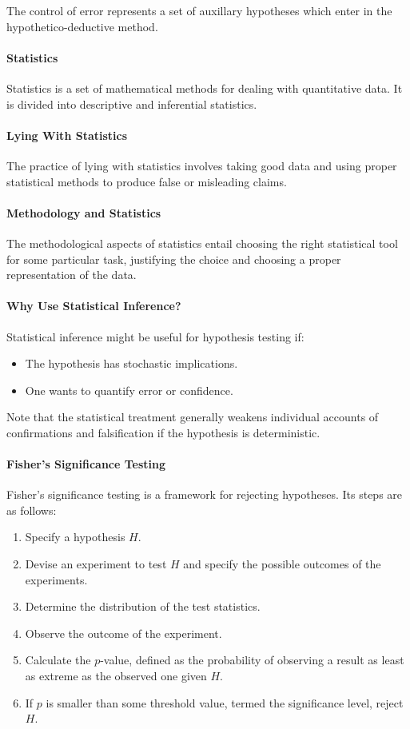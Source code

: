 The control of error represents a set of auxillary hypotheses which enter in the hypothetico-deductive method.

\paragraph{Statistics}
Statistics is a set of mathematical methods for dealing with quantitative data. It is divided into descriptive and inferential statistics.

\paragraph{Lying With Statistics}
The practice of lying with statistics involves taking good data and using proper statistical methods to produce false or misleading claims.

\paragraph{Methodology and Statistics}
The methodological aspects of statistics entail choosing the right statistical tool for some particular task, justifying the choice and choosing a proper representation of the data.

\paragraph{Why Use Statistical Inference?}
Statistical inference might be useful for hypothesis testing if:
\begin{itemize}
	\item The hypothesis has stochastic implications.
	\item One wants to quantify error or confidence.
\end{itemize}

Note that the statistical treatment generally weakens individual accounts of confirmations and falsification if the hypothesis is deterministic.

\paragraph{Fisher's Significance Testing}
Fisher's significance testing is a framework for rejecting hypotheses. Its steps are as follows:

\begin{enumerate}
	\item Specify a hypothesis $H$.
	\item Devise an experiment to test $H$ and specify the possible outcomes of the experiments.
	\item Determine the distribution of the test statistics.
	\item Observe the outcome of the experiment.
	\item Calculate the $p$-value, defined as the probability of observing a result as least as extreme as the observed one given $H$.
	\item If $p$ is smaller than some threshold value, termed the significance level, reject $H$.
\end{enumerate}

